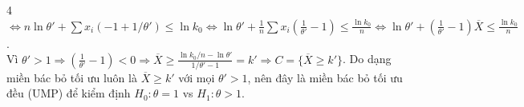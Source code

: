 \documentclass[a4paper,landscape]{article}
\begin{document}
\begin{multicols*}{4}
$\displaystyle \Leftrightarrow n\ln\theta' + \sum x_i (-1 + 1/\theta') \le \ln k_0 \Leftrightarrow \ln\theta' + \frac{1}{n}\sum x_i \left(\frac{1}{\theta'} - 1\right) \le \frac{\ln k_0}{n} \Leftrightarrow \ln\theta' + \left(\frac{1}{\theta'} - 1\right)\overline X \le \frac{\ln k_0}{n}$. \\
Vì $\theta' > 1 \Rightarrow \left(\frac{1}{\theta'} - 1\right) < 0 \Rightarrow \overline X \ge \frac{\ln k_0/n - \ln\theta'}{1/\theta' - 1} = k' \Rightarrow C = \{ \overline X \ge k' \}$. Do dạng miền bác bỏ tối ưu luôn là $\overline X \ge k'$ với mọi $\theta' > 1$, nên đây là miền bác bỏ tối ưu đều (UMP) để kiểm định $H_0:\theta=1$ vs $H_1:\theta > 1$.



\end{multicols*}
\end{document}
